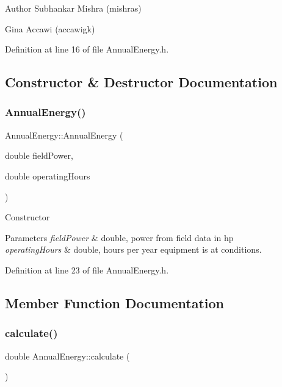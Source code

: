 \begin{DoxyAuthor}{Author}
Subhankar Mishra (mishras) 

Gina Accawi (accawigk) 
\end{DoxyAuthor}


Definition at line 16 of file Annual\+Energy.\+h.



\subsection{Constructor \& Destructor Documentation}
\mbox{\label{class_annual_energy_adb693a67965b0ff46436ee5141ab356d}} 
\subsubsection{\texorpdfstring{Annual\+Energy()}{AnnualEnergy()}}
{\footnotesize\ttfamily Annual\+Energy\+::\+Annual\+Energy (\begin{DoxyParamCaption}\item[{double}]{field\+Power,  }\item[{double}]{operating\+Hours }\end{DoxyParamCaption})\hspace{0.3cm}{\ttfamily [inline]}}

Constructor 
\begin{DoxyParams}{Parameters}
{\em field\+Power} & double, power from field data in hp \\
\hline
{\em operating\+Hours} & double, hours per year equipment is at conditions. \\
\hline
\end{DoxyParams}


Definition at line 23 of file Annual\+Energy.\+h.



\subsection{Member Function Documentation}
\mbox{\label{class_annual_energy_ab599860ffb32ce20a1042a3e9d2ad57f}} 
\subsubsection{\texorpdfstring{calculate()}{calculate()}}
{\footnotesize\ttfamily double Annual\+Energy\+::calculate (\begin{DoxyParamCaption}{ }\end{DoxyParamCaption})}



